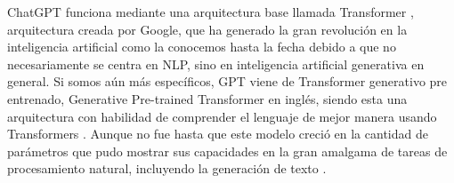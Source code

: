 \par ChatGPT funciona mediante una arquitectura base llamada Transformer \cite{aiayn}, arquitectura creada por Google, que ha generado la gran 
revolución en la inteligencia artificial como la conocemos hasta la fecha debido a que no necesariamente se centra en NLP, 
sino en inteligencia artificial generativa en general. Si somos aún más específicos, GPT viene de Transformer generativo 
pre entrenado, Generative Pre-trained Transformer en inglés, siendo esta una arquitectura con habilidad de comprender el 
lenguaje de mejor manera usando Transformers \cite{mt4}. Aunque no fue hasta que este modelo creció en la cantidad de parámetros que 
pudo mostrar sus capacidades en la gran amalgama de tareas de procesamiento natural, incluyendo la generación de texto \cite{mt5}.
